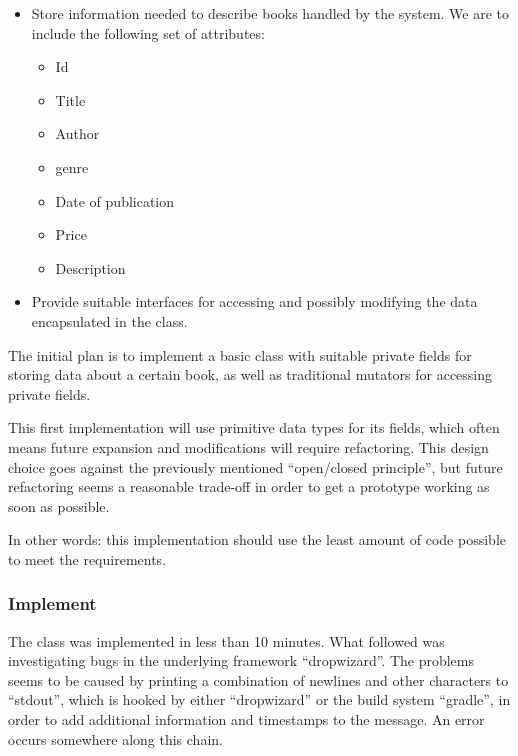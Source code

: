 \begin{itemize}
  \item Store information needed to describe books handled by the system.
        We are to include the following set of attributes:

  \begin{itemize}
    \item Id
    \item Title
    \item Author
    \item genre
    \item Date of publication
    \item Price
    \item Description
  \end{itemize}

  \item Provide suitable interfaces for accessing and possibly modifying the
        data encapsulated in the class.
\end{itemize}

The initial plan is to implement a basic class with suitable private fields for
storing data about a certain book, as well as traditional mutators for
accessing private fields.

This first implementation will use primitive data types for its fields, which
often means future expansion and modifications will require refactoring.
This design choice goes against the previously mentioned ``open/closed
principle'', but future refactoring seems a reasonable trade-off in order to get
a prototype working as soon as possible.


In other words: this implementation should use the least amount of code
possible to meet the requirements.


\subsubsection{Implement}\label{task-1a-implement}
The class was implemented in less than 10 minutes. What followed was
investigating bugs in the underlying framework
``dropwizard''\cite{framework:dropwizard}.  
The problems seems to be caused by printing a combination of newlines and other
characters to ``stdout'', which is hooked by either ``dropwizard'' or the build
system ``gradle''\cite{tool:gradle}, in order to add additional information and
timestamps to the message.  An error occurs somewhere along this chain.


